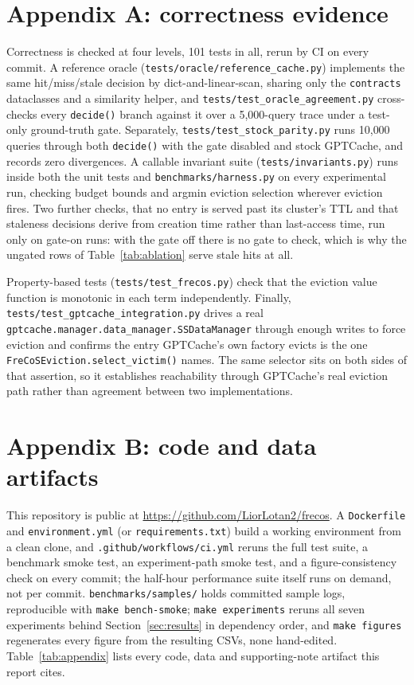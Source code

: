 \documentclass[10pt]{article}
\begin{document}
\appendix
\sloppy
\section*{Appendix A: correctness evidence}

Correctness is checked at four levels, 101 tests in all, rerun by CI on every commit. A
reference oracle
(\texttt{tests/oracle/reference\_cache.py}) implements the same hit/miss/stale decision by
dict-and-linear-scan, sharing only the \texttt{contracts} dataclasses and a similarity
helper, and \texttt{tests/test\_oracle\_agreement.py} cross-checks every \texttt{decide()}
branch against it over a 5{,}000-query trace under a test-only ground-truth gate. Separately,
\texttt{tests/test\_stock\_parity.py} runs 10{,}000 queries through both \texttt{decide()}
with the gate disabled and stock GPTCache, and records zero divergences. A
callable invariant suite (\texttt{tests/invariants.py}) runs inside both the unit tests and
\texttt{benchmarks/harness.py} on every experimental run, checking budget bounds and argmin
eviction selection wherever eviction fires. Two further checks, that no entry is served past
its cluster's TTL and that staleness decisions derive from creation time rather than
last-access time, run only on gate-on runs: with the gate off there is no gate to check, which
is why the ungated rows of Table~\ref{tab:ablation} serve stale hits at all.

Property-based tests (\texttt{tests/test\_frecos.py}) check that the eviction value function is
monotonic in each term independently. Finally, \texttt{tests/test\_gptcache\_integration.py}
drives a real \texttt{gptcache.manager.\allowbreak data\_manager.SSDataManager} through enough writes to force
eviction and confirms the entry GPTCache's own factory evicts is the one
\texttt{FreCoSEviction.select\_victim()} names. The same selector sits on both sides of that
assertion, so it establishes reachability through GPTCache's real eviction path rather than
agreement between two implementations.

\section*{Appendix B: code and data artifacts}

This repository is public at \url{https://github.com/LiorLotan2/frecos}. A
\texttt{Dockerfile} and \texttt{environment.yml} (or \texttt{requirements.txt}) build a
working environment from a clean clone, and \texttt{.github/workflows/ci.yml}
reruns the full test suite, a benchmark smoke test, an experiment-path smoke test, and a
figure-consistency check on every commit; the half-hour performance suite itself runs on
demand, not per commit. \texttt{benchmarks/samples/} holds committed sample logs, reproducible
with \texttt{make bench-smoke}; \texttt{make experiments} reruns all seven experiments behind
Section~\ref{sec:results} in dependency order, and \texttt{make figures} regenerates every
figure from the resulting CSVs, none hand-edited. Table~\ref{tab:appendix} lists every code,
data and supporting-note artifact this report cites.
\end{document}
